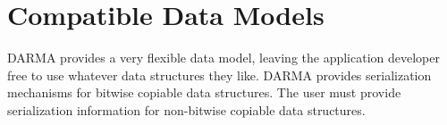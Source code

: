 \section{Compatible Data Models}
\label{sec:data_model}


DARMA provides a very flexible data model, leaving the application developer
free to use whatever data structures they like. 
DARMA provides serialization mechanisms for bitwise copiable data structures.
The user must provide serialization information for non-bitwise copiable data
structures. 



